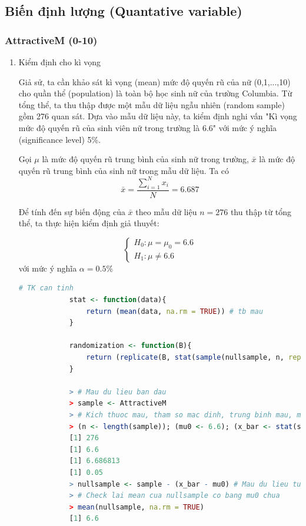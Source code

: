 \documentclass[a4paper,12pt]{article}
\begin{document}
	\subsection{Biến định lượng (Quantative variable)}
	\subsubsection{AttractiveM (0-10)}
	\begin{enumerate}[label = \alph*)]
		\item Kiểm định cho kì vọng \label{1a}
	
			Giả sử, ta cần khảo sát kì vọng (mean) mức độ quyến rũ của nữ (0,1,...,10) cho quần thể (population) là toàn bộ học sinh nữ của trường Columbia. Từ tổng thể, ta thu thập được một mẫu dữ liệu ngẫu nhiên (random sample) gồm 276 quan sát. Dựa vào mẫu dữ liệu này, ta kiểm định nghi vấn "Kì vọng mức độ quyến rũ của sinh viên nữ trong trường là 6.6" với mức ý nghĩa (significance level) 5\%.
			
			Gọi $\mu$ là mức độ quyến rũ trung bình của sinh nữ trong trường, $\bar{x}$ là mức độ quyến rũ trung bình của sinh nữ
			trong mẫu dữ liệu. Ta có
			$$\bar{x} = \frac{\sum_{i = 1}^{N}x_i}{N} =  6.687$$
			
			Để tính đến sự biến động của $\bar{x}$ theo mẫu dữ liệu $n = 276$ thu thập từ tổng thể, ta thực hiện kiểm định giả thuyết:
			
			\begin{equation*}
			\begin{cases}
			H_0: \mu = \mu_0 = 6.6\\
			H_1: \mu \neq 6.6
			\end{cases}
			\end{equation*}
			với mức ý nghĩa $\alpha = 0.5\%$
			
			\begin{lstlisting}[language=R]
			# TK can tinh
			stat <- function(data){
				return (mean(data, na.rm = TRUE)) # tb mau
			}
			
			randomization <- function(B){
				return (replicate(B, stat(sample(nullsample, n, replace = TRUE))))
			}
			
			> # Mau du lieu ban dau
			> sample <- AttractiveM
			> # Kich thuoc mau, tham so mac dinh, trung binh mau, muc y nghia
			> (n <- length(sample)); (mu0 <- 6.6); (x_bar <- stat(sample)); (alpha <- 0.05)
			[1] 276
			[1] 6.6
			[1] 6.686813
			[1] 0.05
			> nullsample <- sample - (x_bar - mu0) # Mau du lieu tuong ung voi H0
			> # Check lai mean cua nullsample co bang mu0 chua
			> mean(nullsample, na.rm = TRUE)
			[1] 6.6
			 

\end{lstlisting}
\end{enumerate}
\end{document}
